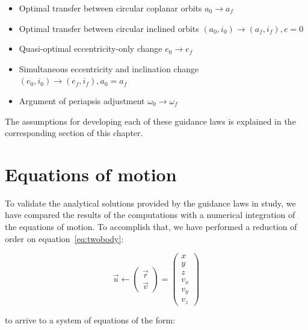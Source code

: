 \begin{itemize}

\item Optimal transfer between circular coplanar orbits $a_0 \rightarrow a_f$ \cite{edelbaum1961propulsion,burt1967space}

\item Optimal transfer between circular inclined orbits $(a_0, i_0) \rightarrow (a_f, i_f), e = 0$ \cite{edelbaum1961propulsion,kechichian1997reformulation}

\item Quasi-optimal eccentricity-only change $e_0 \rightarrow e_f$ \cite{pollard1997simplified}

\item Simultaneous eccentricity and inclination change $(e_0, i_0) \rightarrow (e_f, i_f), a_0 = a_f$ \cite{pollard2000simplified}

\item Argument of periapsis adjustment $\omega_0 \rightarrow \omega_f$ \cite{pollard1998evaluation}

\end{itemize}

The assumptions for developing each of these guidance laws is explained in the corresponding section of this chapter.

\section{Equations of motion} \label{sec:motion}

To validate the analytical solutions provided by the guidance laws in study, we have compared the results of the computations with a numerical integration of the equations of motion. To accomplish that, we have performed a reduction of order on equation~\ref{eq:twobody}:

\[
\vec{u} \longleftarrow \begin{pmatrix} \vec{r} \\ \vec{v} \end{pmatrix} = \begin{pmatrix} x \\ y \\ z \\ v_x \\ v_y \\ v_z \end{pmatrix}
\]

to arrive to a system of equations of the form:

